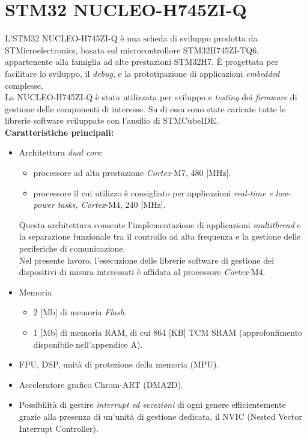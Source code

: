 \documentclass[11pt]{report}
\begin{document}
\section{STM32 NUCLEO-H745ZI-Q}
L'STM32 NUCLEO-H745ZI-Q è una scheda di sviluppo prodotta da STMicroelectronics, basata sul microcontrollore STM32H745ZI-TQ6, 
appartenente alla famiglia ad alte prestazioni STM32H7. È progettata per facilitare lo sviluppo, il \textit{debug}, e la prototipazione di applicazioni 
\textit{embedded} complesse.\\
La NUCLEO-H745ZI-Q è stata utilizzata per sviluppo e \textit{testing} dei \textit{firmware} di gestione delle componenti di interesse.
Su di essa sono state caricate tutte le librerie software sviluppate con l'ausilio di STMCubeIDE.\\
\textbf{Caratteristiche principali:}
\begin{itemize}
    \item Architettura \textit{dual core}:
    \begin{itemize}
        \item processore ad alta prestazione \textit{Cortex}-M7, 480 [MHz].
        \item processore il cui utilizzo è consigliato per applicazioni \textit{real-time e low-power tasks, Cortex}-M4, 240 [MHz].
    \end{itemize}
        Questa architettura consente l'implementazione di applicazioni \textit{multithread} e la separazione funzionale tra il controllo ad alta frequenza e la gestione delle periferiche di comunicazione.\\
        Nel presente lavoro, l'esecuzione delle librerie software di gestione dei dispositivi di misura interessati è affidata al processore \textit{Cortex}-M4.
    \item Memoria
    \begin{itemize}
        \item 2 [Mb] di memoria \textit{Flash}.
        \item 1 [Mb] di memoria RAM, di cui 864 [KB] TCM SRAM (approfonfimento disponibile nell'appendice A).
    \end{itemize}
    \item FPU, DSP, unità di protezione della memoria (MPU).
    \item Acceleratore grafico Chrom-ART (DMA2D).
    \item Possibilità di gestire \textit{interrupt ed eccezioni} di ogni genere efficientemente grazie alla presenza di un'unità di gestione dedicata, il NVIC (Nested Vector Interrupt Controller).\\
\end{itemize}
\end{document}
